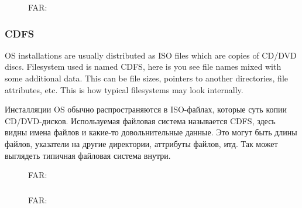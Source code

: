 \begin{figure}[H]
\centering
{}
\caption{FAR: }
\end{figure}

\clearpage
\subsubsection{\ac{CDFS}}

\ifdefined\ENGLISH
\ac{OS} installations are usually distributed as ISO files which are copies of CD/DVD discs.
Filesystem used is named \ac{CDFS}, here is you see file names mixed with some additional data.
This can be file sizes, pointers to another directories, file attributes, etc.
This is how typical filesystems may look internally.
\fi %

\ifdefined\RUSSIAN
Инсталляции \ac{OS} обычно распространяются в ISO-файлах, которые суть копии CD/DVD-дисков.
Используемая файловая система называется \ac{CDFS}, здесь видны имена файлов и какие-то довольнительные данные.
Это могут быть длины файлов, указатели на другие директории, аттрибуты файлов, итд.
Так может выглядеть типичная файловая система внутри.
\fi %

\begin{figure}[H]
\centering
{}
\caption{FAR: }
\end{figure}

\clearpage
\subsubsection{}


\begin{figure}[H]
\centering
{}
\caption{FAR: }
\end{figure}



